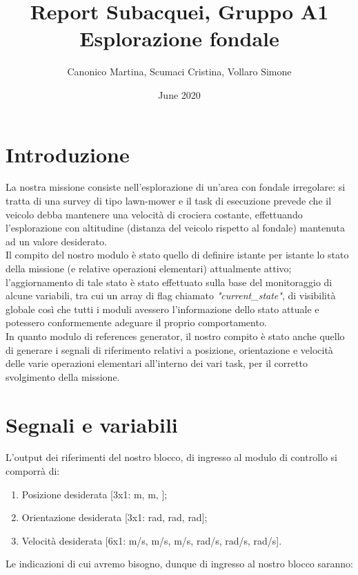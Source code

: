 \documentclass{article}
\title{Report Subacquei, Gruppo A1\\
Esplorazione fondale}
\author{Canonico Martina, Scumaci Cristina, Vollaro Simone}
\date{June 2020}
\begin{document}
    
    \tableofcontents{}
    
    \newpage
    \section{Introduzione}
    La nostra missione consiste nell'esplorazione di un'area con fondale irregolare: si tratta di una survey di tipo lawn-mower e il task
    di esecuzione prevede che il veicolo debba mantenere una velocità di crociera costante, effettuando l'esplorazione con altitudine 
    (distanza del veicolo rispetto al fondale) mantenuta ad un valore desiderato.\\
    Il compito del nostro modulo è stato quello di definire istante per istante lo stato della missione (e relative operazioni elementari) attualmente attivo;
    l’aggiornamento di tale stato è stato effettuato sulla base del monitoraggio di alcune variabili, tra cui un array di flag
    chiamato \textit{"current\_state"}, di visibilità globale così che tutti i moduli avessero l'informazione dello stato attuale e
    potessero conformemente adeguare il proprio comportamento.\\
    In quanto modulo di references generator, il nostro compito è stato anche quello di generare i segnali di riferimento relativi a posizione,
    orientazione e velocità delle varie operazioni elementari all'interno dei vari task, per il corretto svolgimento della missione.\\

    \newpage
    \section{Segnali e variabili}
        
        L’output dei riferimenti del nostro blocco, di ingresso al modulo di controllo si comporrà di:\\

        \begin{enumerate}
            \item Posizione desiderata [3x1: m, m, \degree];
            \item Orientazione desiderata [3x1: rad, rad, rad];
            \item Velocità desiderata [6x1: m/s, m/s, m/s, rad/s, rad/s, rad/s].
        \end{enumerate} 

        \noindent
        Le indicazioni di cui avremo bisogno, dunque di ingresso al nostro blocco saranno:\\
\end{document}
